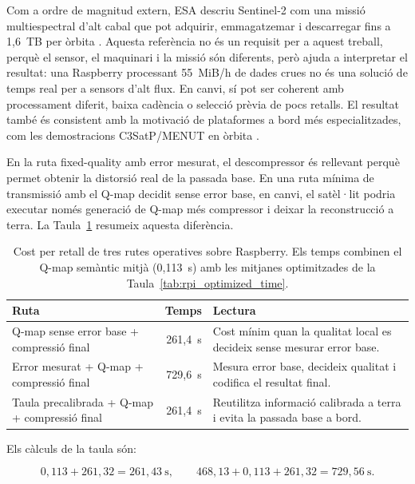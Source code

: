 Com a ordre de magnitud extern, ESA descriu Sentinel-2 com una missió
multiespectral d'alt cabal que pot adquirir, emmagatzemar i descarregar fins a
1,6~TB per òrbita \cite{esa_sentinel2_operations}. Aquesta
referència no és un requisit per a aquest treball, perquè el sensor, el
maquinari i la missió són diferents, però ajuda a interpretar el resultat: una
Raspberry processant 55~MiB/h de dades crues no és una solució de temps real per
a sensors d'alt flux. En canvi, sí pot ser coherent amb processament diferit,
baixa cadència o selecció prèvia de pocs retalls. El resultat també és
consistent amb la motivació de plataformes a bord més especialitzades, com les
demostracions C3SatP/MENUT en òrbita \cite{serra2024c3satp}.

En la ruta fixed-quality amb error mesurat, el descompressor és rellevant perquè
permet obtenir la distorsió real de la passada base. En una ruta mínima de
transmissió amb el Q-map decidit sense error base, en canvi, el satèl·lit podria
executar només generació de Q-map més compressor i deixar la reconstrucció a
terra. La Taula~\ref{tab:operational_routes_cost} resumeix aquesta diferència.

\begin{table}[H]
\centering
\footnotesize
\begin{tabularx}{\textwidth}{>{\raggedright\arraybackslash}p{}r>{\raggedright\arraybackslash}X}
\toprule
Ruta & Temps & Lectura \\
\midrule
Q-map sense error base + compressió final & 261,4~s &
Cost mínim quan la qualitat local es decideix sense mesurar error base. \\
Error mesurat + Q-map + compressió final & 729,6~s &
Mesura error base, decideix qualitat i codifica el resultat final. \\
Taula precalibrada + Q-map + compressió final & 261,4~s &
Reutilitza informació calibrada a terra i evita la passada base a bord. \\
\bottomrule
\end{tabularx}
\caption{Cost per retall de tres rutes operatives sobre Raspberry. Els temps
combinen el Q-map semàntic mitjà (0,113~s) amb les mitjanes optimitzades de la
Taula~\ref{tab:rpi_optimized_time}.}
\label{tab:operational_routes_cost}
\end{table}

Els càlculs de la taula són:

\begin{equation}
0,113+261,32=261,43~\text{s},
\qquad
468,13+0,113+261,32=729,56~\text{s}.
\end{equation}

